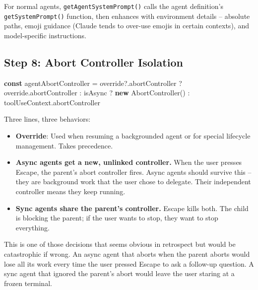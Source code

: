 \documentclass[
  english,
  11pt,
  letterpaper,
]{book}
\newenvironment{Shaded}{\begin{snugshade}}{\end{snugshade}}
\newcommand{\AttributeTok}[1]{\textcolor[rgb]{0.40,0.45,0.13}{#1}}
\newcommand{\FunctionTok}[1]{\textcolor[rgb]{0.28,0.35,0.67}{#1}}
\newcommand{\KeywordTok}[1]{\textcolor[rgb]{0.00,0.23,0.31}{\textbf{#1}}}
\newcommand{\NormalTok}[1]{\textcolor[rgb]{0.00,0.23,0.31}{#1}}
\newcommand{\OperatorTok}[1]{\textcolor[rgb]{0.37,0.37,0.37}{#1}}
\providecommand{\tightlist}{%
  \setlength{\itemsep}{0pt}\setlength{\parskip}{0pt}}
\begin{document}
For normal agents, \texttt{getAgentSystemPrompt()} calls the agent
definition's \texttt{getSystemPrompt()} function, then enhances with
environment details -- absolute paths, emoji guidance (Claude tends to
over-use emojis in certain contexts), and model-specific instructions.

\subsection{Step 8: Abort Controller
Isolation}\label{step-8-abort-controller-isolation}

\begin{Shaded}
\begin{Highlighting}[]
\KeywordTok{const}\NormalTok{ agentAbortController }\OperatorTok{=}\NormalTok{ override}\OperatorTok{?.}\AttributeTok{abortController}
  \OperatorTok{?}\NormalTok{ override}\OperatorTok{.}\AttributeTok{abortController}
  \OperatorTok{:}\NormalTok{ isAsync}
    \OperatorTok{?} \KeywordTok{new} \FunctionTok{AbortController}\NormalTok{()}
    \OperatorTok{:}\NormalTok{ toolUseContext}\OperatorTok{.}\AttributeTok{abortController}
\end{Highlighting}
\end{Shaded}

Three lines, three behaviors:

\begin{itemize}
\tightlist
\item
  \textbf{Override}: Used when resuming a backgrounded agent or for
  special lifecycle management. Takes precedence.
\item
  \textbf{Async agents get a new, unlinked controller.} When the user
  presses Escape, the parent's abort controller fires. Async agents
  should survive this -- they are background work that the user chose to
  delegate. Their independent controller means they keep running.
\item
  \textbf{Sync agents share the parent's controller.} Escape kills both.
  The child is blocking the parent; if the user wants to stop, they want
  to stop everything.
\end{itemize}

This is one of those decisions that seems obvious in retrospect but
would be catastrophic if wrong. An async agent that aborts when the
parent aborts would lose all its work every time the user pressed Escape
to ask a follow-up question. A sync agent that ignored the parent's
abort would leave the user staring at a frozen terminal.
\end{document}

